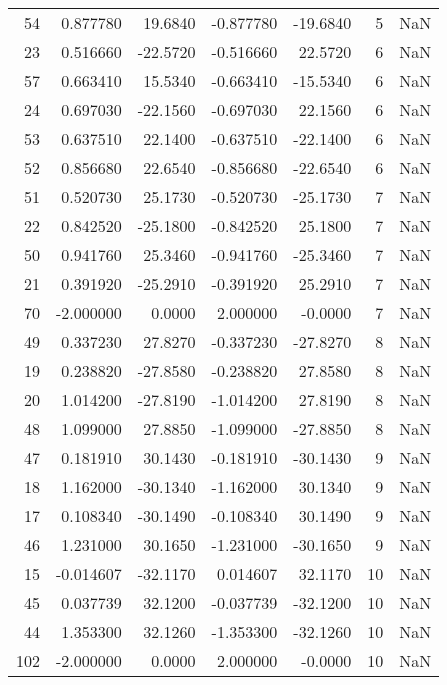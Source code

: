 \begin{tabular}{rrrrrrr}
 54 &  0.877780 &  19.6840 & -0.877780 &    -19.6840 &           5 & NaN \\
 23 &  0.516660 & -22.5720 & -0.516660 &     22.5720 &           6 & NaN \\
 57 &  0.663410 &  15.5340 & -0.663410 &    -15.5340 &           6 & NaN \\
 24 &  0.697030 & -22.1560 & -0.697030 &     22.1560 &           6 & NaN \\
 53 &  0.637510 &  22.1400 & -0.637510 &    -22.1400 &           6 & NaN \\
 52 &  0.856680 &  22.6540 & -0.856680 &    -22.6540 &           6 & NaN \\
 51 &  0.520730 &  25.1730 & -0.520730 &    -25.1730 &           7 & NaN \\
 22 &  0.842520 & -25.1800 & -0.842520 &     25.1800 &           7 & NaN \\
 50 &  0.941760 &  25.3460 & -0.941760 &    -25.3460 &           7 & NaN \\
 21 &  0.391920 & -25.2910 & -0.391920 &     25.2910 &           7 & NaN \\
 70 & -2.000000 &   0.0000 &  2.000000 &     -0.0000 &           7 & NaN \\
 49 &  0.337230 &  27.8270 & -0.337230 &    -27.8270 &           8 & NaN \\
 19 &  0.238820 & -27.8580 & -0.238820 &     27.8580 &           8 & NaN \\
 20 &  1.014200 & -27.8190 & -1.014200 &     27.8190 &           8 & NaN \\
 48 &  1.099000 &  27.8850 & -1.099000 &    -27.8850 &           8 & NaN \\
 47 &  0.181910 &  30.1430 & -0.181910 &    -30.1430 &           9 & NaN \\
 18 &  1.162000 & -30.1340 & -1.162000 &     30.1340 &           9 & NaN \\
 17 &  0.108340 & -30.1490 & -0.108340 &     30.1490 &           9 & NaN \\
 46 &  1.231000 &  30.1650 & -1.231000 &    -30.1650 &           9 & NaN \\
 15 & -0.014607 & -32.1170 &  0.014607 &     32.1170 &          10 & NaN \\
 45 &  0.037739 &  32.1200 & -0.037739 &    -32.1200 &          10 & NaN \\
 44 &  1.353300 &  32.1260 & -1.353300 &    -32.1260 &          10 & NaN \\
102 & -2.000000 &   0.0000 &  2.000000 &     -0.0000 &          10 & NaN \\

\end{tabular}
